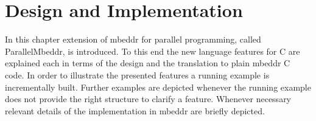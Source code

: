 \chapter{Design and Implementation}
In this chapter extension of mbeddr for parallel programming, called ParallelMbeddr, is introduced. To this end the new language features for C are explained each in terms of the design and the translation to plain mbeddr C code. In order to illustrate the presented features a running example is incrementally built. Further examples are depicted whenever the running example does not provide the right structure to clarify a feature.
Whenever necessary relevant details of the implementation in mbeddr are briefly depicted. 



